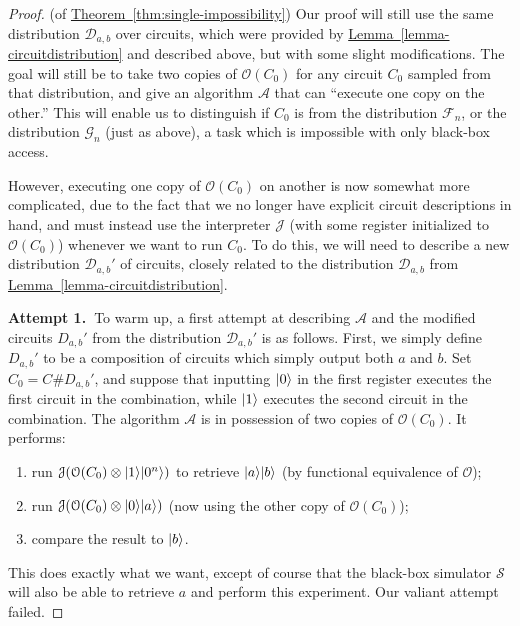 \documentclass[envcountsame]{llncs}
\numberwithin{equation}{section}
\newcommand{\expref}[2]{\texorpdfstring{\hyperref[#2]{#1~\ref{#2}}}{#1~\ref{#2}}}
\newcommand{\algo}{\mathcal}
\begin{document}
\begin{proof} (of \expref{Theorem}{thm:single-impossibility})
Our proof will still use the same distribution $\mathcal D_{a, b}$ over circuits, which were provided by \expref{Lemma}{lemma-circuitdistribution} and described above, but with some slight modifications. The goal will still be to take two copies of $\algo O(C_0)$ for any circuit $C_0$ sampled from that distribution, and give an algorithm $\algo A$ that can ``execute one copy on the other.'' This will enable us to distinguish if $C_0$ is from the distribution $\mathcal F_n$, or the distribution $\mathcal G_n$ (just as above), a task which is impossible with only black-box access.

However, executing one copy of $\algo O(C_0)$ on another is now somewhat more complicated, due to the fact that we no longer have explicit circuit descriptions in hand, and must instead use the interpreter $\algo J$ (with some register initialized to $\algo O(C_0)$) whenever we want to run $C_0$. To do this, we will need to describe a new distribution $\mathcal D_{a, b}'$ of circuits, closely related to the distribution $\mathcal D_{a, b}$ from \expref{Lemma}{lemma-circuitdistribution}.

\textbf{Attempt 1.~}To warm up, a first attempt at describing $\algo A$ and the modified circuits $D_{a, b}'$ from the distribution $\mathcal D_{a, b}'$ is as follows. First, we simply define $D_{a, b}'$ to be a composition of circuits which simply output both $a$ and $b$. Set $C_0 = C \# D_{a, b}'$, and suppose that inputting ${\left\vert{0}\right\rangle}$ in the first register executes the first circuit in the combination, while ${\left\vert{1}\right\rangle}$ executes the second circuit in the combination. The algorithm $\algo A$ is in possession of two copies of $\algo O(C_0)$. It performs:
\begin{enumerate}
\item run $\algo J ( \algo O(C_0) \otimes \ket{1} \ket{0^n})$ to retrieve ${\left\vert{a}\right\rangle} {\left\vert{b}\right\rangle}$ (by functional equivalence of $\algo O$);
\item run $\algo J( \algo O(C_0) \otimes \ket{0} \ket{a})$ (now using the other copy of $\algo O(C_0)$);
\item compare the result to ${\left\vert{b}\right\rangle}$.
\end{enumerate}
This does exactly what we want, except of course that the black-box simulator $\algo S$ will also be able to retrieve $a$ and perform this experiment. Our valiant attempt failed.


\end{proof}
\end{document}
